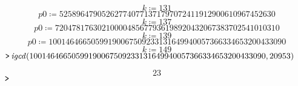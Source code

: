 \documentclass{article}
\begin{document}
\vspace{-\bigskipamount}
\begin{dmath*}
k \coloneqq 131
\end{dmath*}
\vspace{-\bigskipamount}
\begin{dmath*}
\mathit{p0} \coloneqq 525896479052627740771371797072411912900610967452630
\end{dmath*}
\vspace{-\bigskipamount}
\begin{dmath*}
k \coloneqq 137
\end{dmath*}
\vspace{-\bigskipamount}
\begin{dmath*}
\mathit{p0} \coloneqq 72047817630210000485677936198920432067383702541010310
\end{dmath*}
\vspace{-\bigskipamount}
\begin{dmath*}
k \coloneqq 139
\end{dmath*}
\vspace{-\bigskipamount}
\begin{dmath*}
\mathit{p0} \coloneqq 10014646650599190067509233131649940057366334653200433090
\end{dmath*}
\vspace{-\bigskipamount}
\begin{dmath}\label{(3)}
k \coloneqq 149
\end{dmath}
\mapleinput
{$ \displaystyle \texttt{>\,} \mathit{igcd} (10014646650599190067509233131649940057366334653200433090,20953) $}

\begin{dmath}\label{(4)}
23
\end{dmath}
\mapleinput
{$ \displaystyle \texttt{>\,} \, $}
\end{document}

